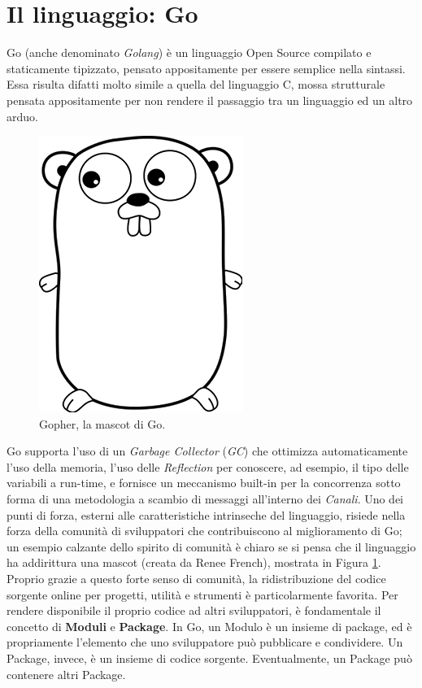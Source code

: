 \section{Il linguaggio: Go}
Go \cite{go} (anche denominato \textit{Golang}) è un linguaggio Open Source compilato e staticamente tipizzato, pensato appositamente per essere semplice nella sintassi. Essa risulta difatti molto simile a quella del linguaggio C, mossa strutturale pensata appositamente per non rendere il passaggio tra un linguaggio ed un altro arduo. 
\begin{figure}
\centering
    \includegraphics{images/gopher.png}
    \caption{Gopher, la mascot di Go.}
    \label{fig:gopher}
\end{figure}
Go supporta l'uso di un \textit{Garbage Collector} (\textit{GC}) che ottimizza automaticamente l'uso della memoria, l'uso delle \textit{Reflection} per conoscere, ad esempio, il tipo delle variabili a run-time, e fornisce un meccanismo built-in per la concorrenza sotto forma di una metodologia a scambio di messaggi all'interno dei \textit{Canali}. Uno dei punti di forza, esterni alle caratteristiche intrinseche del linguaggio, risiede nella forza della comunità di sviluppatori che contribuiscono al miglioramento di Go; un esempio calzante dello spirito di comunità è chiaro se si pensa che il linguaggio ha addirittura una mascot (creata da Renee French), mostrata in Figura \ref{fig:gopher}. Proprio grazie a questo forte senso di comunità, la ridistribuzione del codice sorgente online per progetti, utilità e strumenti è particolarmente favorita. Per rendere disponibile il proprio codice ad altri sviluppatori, è fondamentale il concetto di \textbf{Moduli} e \textbf{Package}. In Go, un Modulo è un insieme di package, ed è propriamente l'elemento che uno sviluppatore può pubblicare e condividere. Un Package, invece, è un insieme di codice sorgente. Eventualmente, un Package può contenere altri Package.

